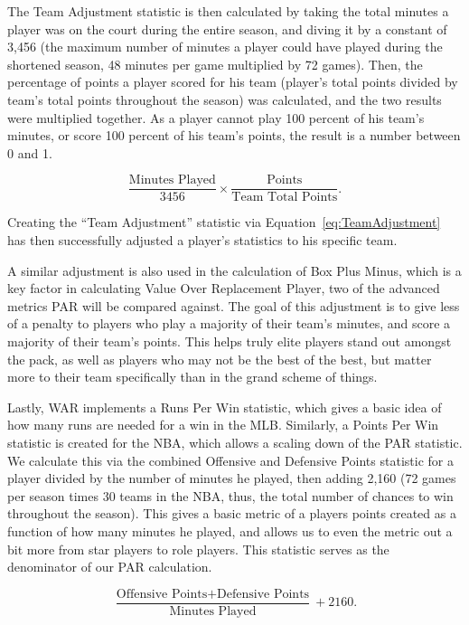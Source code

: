 \documentclass[titlepage, 12pt]{article}
\begin{document}
The Team Adjustment statistic 
is then calculated by taking the total minutes a player was on the court 
during the entire season, and diving 
it by a constant of 3,456 (the maximum number of minutes a player could 
have played during the shortened 
season, 48 minutes per game multiplied by 72 games). Then, the 
percentage of points a player scored for 
his team (player's total points divided by team's total points throughout the 
season) was calculated, and the 
two results were multiplied together. As a player cannot play 100 percent 
of his team's minutes, or score 
100 percent of his team's points, the result is a number between 0 and 1. 

\begin{equation}
\label{eq:TeamAdjustment}
  \frac{\text{Minutes Played}}{3456} \times
  \frac{\text{Points}}{\text{Team Total Points}}.
\end{equation}

Creating the ``Team Adjustment'' statistic via 
Equation~\eqref{eq:TeamAdjustment} has then successfully adjusted a 
player's statistics to his specific team.

A similar adjustment is also used 
in the calculation of Box Plus Minus, which is a key factor in calculating 
Value Over Replacement Player, 
two of the advanced metrics PAR will be compared against. The goal of 
this adjustment is to give less of a 
penalty to players who play a majority of their team's minutes, and score a 
majority of their team's points. 
This helps truly elite players stand out amongst the pack, as well as 
players who may not be the best of the 
best, but matter more to their team specifically than in the grand scheme 
of things.

Lastly, WAR implements a Runs Per Win statistic, which gives a basic 
idea of how many runs are needed 
for a win in the MLB. Similarly, a Points Per Win statistic is created for the 
NBA, which allows a scaling 
down of the PAR statistic. We calculate this via the combined Offensive 
and Defensive Points statistic for a 
player divided by the number of minutes he played, then adding 2,160 (72 
games per season times 30 
teams in the NBA, thus, the total number of chances to win throughout the 
season). This gives a basic 
metric of a players points created as a function of how many minutes he 
played, and allows us to even the 
metric out a bit more from star players to role players. This statistic serves 
as the denominator of our PAR 
calculation.

\begin{equation}
\label{eq:PointsPerWin}
 \frac{\text{Offensive Points} + \text{Defensive Points}} {\text{Minutes 
Played}} + 2160.
\end{equation}
\end{document}
